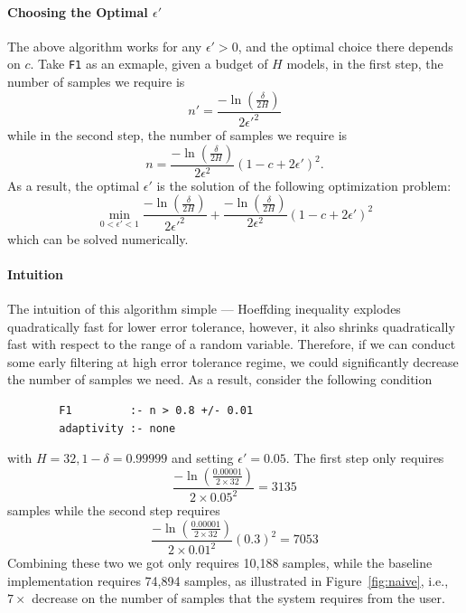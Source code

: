 \documentclass{article}
\begin{document}
\paragraph*{Choosing the Optimal $\epsilon'$} The above 
algorithm works for any $\epsilon' > 0$, and the optimal
choice there depends on $c$. Take \texttt{F1}
as an exmaple, given a budget
of $H$ models, in the first step, the number of samples
we require is
\[
n' = \frac{ -\ln (\frac{\delta}{2 H})}{2 \epsilon'^2}
\]
while in the second step, the number of samples
we require is
\[
n  = \frac{ -\ln (\frac{\delta}{2 H})}{2 \epsilon^2} (1 - c + 2\epsilon')^2.
\]
As a result, the optimal $\epsilon'$ is the solution
of the following optimization problem:
\[
\min_{0 < \epsilon' < 1} \frac{ -\ln (\frac{\delta}{2 H})}{2 \epsilon'^2} + \frac{ -\ln (\frac{\delta}{2 H})}{2 \epsilon^2} (1 - c + 2\epsilon')^2
\]
which can be solved numerically.

\paragraph*{Intuition} The intuition of this algorithm simple --- 
Hoeffding inequality explodes quadratically fast for lower error
tolerance, however, it also shrinks quadratically fast
with respect to the range of a random variable. Therefore,
if we can conduct some early filtering at high error
tolerance regime, we could significantly decrease the number of
samples we need. As a result, consider the following
condition 
\begin{verbatim}
        F1         :- n > 0.8 +/- 0.01
        adaptivity :- none
\end{verbatim}
with $H=32, 1 - \delta=0.99999$ and setting $\epsilon' = 0.05$.
The first step only requires
\[
\frac{ -\ln (\frac{0.00001}{2 \times 32})}{2 \times 0.05^2} = 3135
\]
samples while the second step requires
\[
\frac{ -\ln (\frac{0.00001}{2 \times 32})}{2 \times 0.01^2} (0.3)^2 = 7053
\]
Combining these two we got only requires 10,188 samples,
while the baseline implementation requires 74,894 samples,
as illustrated in Figure~\ref{fig:naive}, i.e., $7\times$ decrease
on the number of samples that the system requires from the user.
\end{document}

